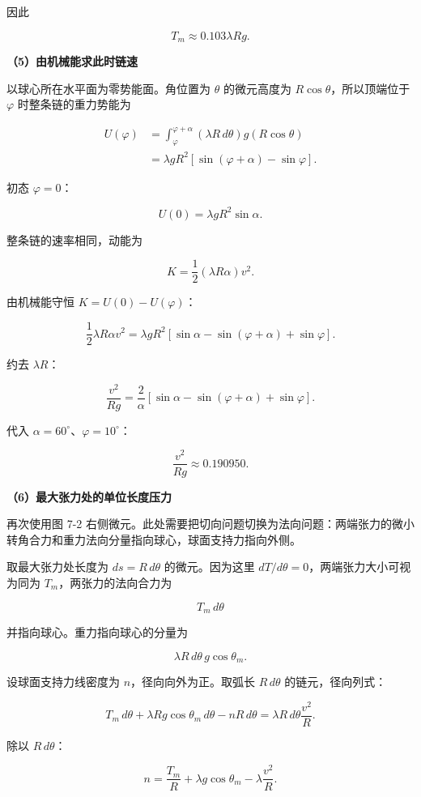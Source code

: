 \documentclass[12pt,a4paper,UTF8]{ctexart}
\begin{document}
因此

\[
\boxed{T_m\approx0.103\lambda Rg}.
\tag{14}
\]

\textbf{（5）由机械能求此时链速}

以球心所在水平面为零势能面。角位置为 \(\theta\) 的微元高度为
\(R\cos\theta\)，所以顶端位于 \(\varphi\) 时整条链的重力势能为

\[
\begin{aligned}
U(\varphi)
&=\int_\varphi^{\varphi+\alpha}
(\lambda R\,d\theta)g(R\cos\theta)\\
&=\lambda gR^2
[\sin(\varphi+\alpha)-\sin\varphi].
\end{aligned}
\tag{15}
\]

初态 \(\varphi=0\)：

\[
U(0)=\lambda gR^2\sin\alpha.
\]

整条链的速率相同，动能为

\[
K=\frac12(\lambda R\alpha)v^2.
\]

由机械能守恒 \(K=U(0)-U(\varphi)\)：

\[
\frac12\lambda R\alpha v^2
=\lambda gR^2
[\sin\alpha-\sin(\varphi+\alpha)+\sin\varphi].
\]

约去 \(\lambda R\)：

\[
\boxed{
\frac{v^2}{Rg}
=\frac2\alpha
[\sin\alpha-\sin(\varphi+\alpha)+\sin\varphi]
}.
\tag{16}
\]

代入 \(\alpha=60^\circ\)、\(\varphi=10^\circ\)：

\[
\frac{v^2}{Rg}\approx0.190950.
\tag{17}
\]

\textbf{（6）最大张力处的单位长度压力}

再次使用图 7-2
右侧微元。此处需要把切向问题切换为法向问题：两端张力的微小转角合力和重力法向分量指向球心，球面支持力指向外侧。

取最大张力处长度为 \(ds=R\,d\theta\) 的微元。因为这里
\(dT/d\theta=0\)，两端张力大小可视为同为 \(T_m\)，两张力的法向合力为

\[
T_m\,d\theta
\]

并指向球心。重力指向球心的分量为

\[
\lambda R\,d\theta\,g\cos\theta_m.
\]

设球面支持力线密度为 \(n\)，径向向外为正。取弧长 \(R\,d\theta\)
的链元，径向列式：

\[
T_m\,d\theta
+\lambda Rg\cos\theta_m\,d\theta
-nR\,d\theta
=\lambda R\,d\theta\frac{v^2}{R}.
\]

除以 \(R\,d\theta\)：

\[
n=\frac{T_m}{R}+\lambda g\cos\theta_m-\lambda\frac{v^2}{R}.
\tag{18}
\]
\end{document}
